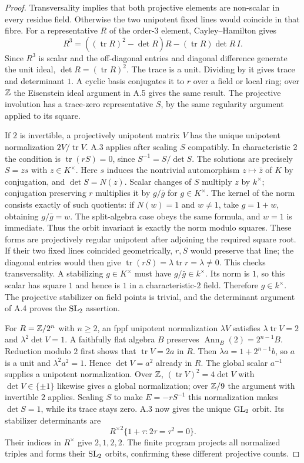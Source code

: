 \begin{proof}
Transversality implies that both projective elements are non-scalar
in every residue field. Otherwise the two unipotent fixed lines
would coincide in that fibre. For a representative $R$ of the
order-$3$ element, Cayley--Hamilton gives
\[
 R^3=((\operatorname{tr}R)^2-\det R)R
       -(\operatorname{tr}R)\det R\,I.
\]
Since $R^3$ is scalar and the off-diagonal entries and diagonal
difference generate the unit ideal, $\det R=(\operatorname{tr}R)^2$.
The trace is a unit. Dividing by it gives trace and determinant $1$.
A cyclic basis conjugates it to $r$ over a field or local ring;
over $\mathbb Z$ the Eisenstein ideal argument in A.5 gives the same result.
The projective involution has a trace-zero representative $S$, by
the same regularity argument applied to its square.

If $2$ is invertible, a projectively unipotent matrix $V$ has the
unique unipotent normalization $2V/\operatorname{tr}V$.
A.3 applies after scaling $S$ compatibly. In characteristic $2$
the condition is $\operatorname{tr}(rS)=0$, since
$S^{-1}=S/\det S$. The solutions are precisely $S=z s$ with
$z\in K^\times$. Here $s$ induces the nontrivial automorphism
$z\mapsto\bar z$ of $K$ by conjugation, and $\det S=N(z)$.
Scalar changes of $S$ multiply $z$ by $k^\times$; conjugation
preserving $r$ multiplies it by $g/\bar g$ for $g\in K^\times$.
The kernel of the norm consists exactly of such quotients:
if $N(w)=1$ and $w\ne1$, take $g=1+w$, obtaining
$g/\bar g=w$. The split-algebra case obeys the same formula,
and $w=1$ is immediate. Thus the orbit invariant is exactly
the norm modulo squares. These forms are projectively regular
unipotent after adjoining the required square root. If their
two fixed lines coincided geometrically, $r,S$ would preserve
that line; the diagonal entries would then give
$\operatorname{tr}(rS)=\lambda\operatorname{tr}r=\lambda\ne0$.
This checks transversality. A stabilizing $g\in K^\times$ must have
$g/\bar g\in k^\times$. Its norm is $1$, so this scalar has square
$1$ and hence is $1$ in a characteristic-$2$ field. Therefore
$g\in k^\times$. The projective stabilizer on field points is trivial,
and the determinant argument of A.4 proves the $\operatorname{SL}_2$ assertion.

For $R=\mathbb Z/2^n$ with $n\ge2$, an fppf unipotent normalization
$\lambda V$ satisfies $\lambda\operatorname{tr}V=2$ and
$\lambda^2\det V=1$. A faithfully flat algebra $B$ preserves
$\operatorname{Ann}_B(2)=2^{n-1}B$. Reduction modulo $2$ first
shows that $\operatorname{tr}V=2a$ in $R$. Then
$\lambda a=1+2^{n-1}b$, so $a$ is a unit and
$\lambda^2a^2=1$. Hence $\det V=a^2$ already in $R$.
The global scalar $a^{-1}$ supplies a unipotent normalization.
Over $\mathbb Z$, $(\operatorname{tr}V)^2=4\det V$ with
$\det V\in\{\pm1\}$ likewise gives a global normalization;
over $\mathbb Z/9$ the argument with invertible $2$ applies. Scaling
$S$ to make $E=-rS^{-1}$ this normalization makes
$\det S=1$, while its trace stays zero. A.3 now gives the
unique $\operatorname{GL}_2$ orbit. Its stabilizer determinants are
\[
 R^{\times2}\{1+\tau:2\tau=\tau^2=0\}.
\]
Their indices in $R^\times$ give $2,1,2,2$. The finite program
projects all normalized triples and forms their $\operatorname{SL}_2$ orbits,
confirming these different projective counts.


\end{proof}
